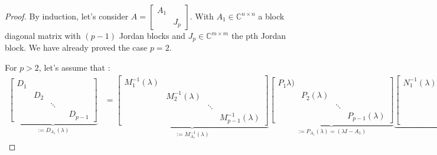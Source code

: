 \documentclass[11pt]{article}
\begin{document}
\begin{proof}
By induction, let's consider $A=\begin{bmatrix}
A_1 & \\
 & J_p
\end{bmatrix}$. With $A_1 \in \mathbb{C}^{n\times n}$ a block diagonal matrix with $(p-1)$ Jordan blocks and $J_p\in \mathbb{C}^{m\times m}$ the pth Jordan block. 
We have already proved the case $p = 2$.

For $p > 2$, let's assume that :
\footnotesize{
\begin{align*}
\underbrace{\begin{bmatrix}
D_1 & & & \\
& D_2 & & \\
& & \ddots & \\
& & & & D_{p-1}
\end{bmatrix} }_{:= D_{A_1}(\lambda)}
&=
\underbrace{\begin{bmatrix}
M_1^{-1}(\lambda) & & &\\
& M_2^{-1}(\lambda) & &\\
& & \ddots & \\
& & & M_{p-1}^{-1}(\lambda)
\end{bmatrix}}_{:=M_{A_1}^{-1}(\lambda)}
\underbrace{\begin{bmatrix}
P_1\lambda) & & &\\
& P_2(\lambda) & &\\
& &\ddots &\\
& & &  P_{p-1}(\lambda)
\end{bmatrix}}_{:= P_{A_1}(\lambda) = (\lambda I - A_1)}
\underbrace{\begin{bmatrix}
N_1^{-1}(\lambda) & & &\\
& N_2^{-1}(\lambda) & &\\
& & N_3^{-1}(\lambda) & \\
& & & \ddots
\end{bmatrix}}_{:=N_{A_1}^{-1}(\lambda)}
\end{align*}}
 \normalsize
 

\end{proof}
\end{document}
